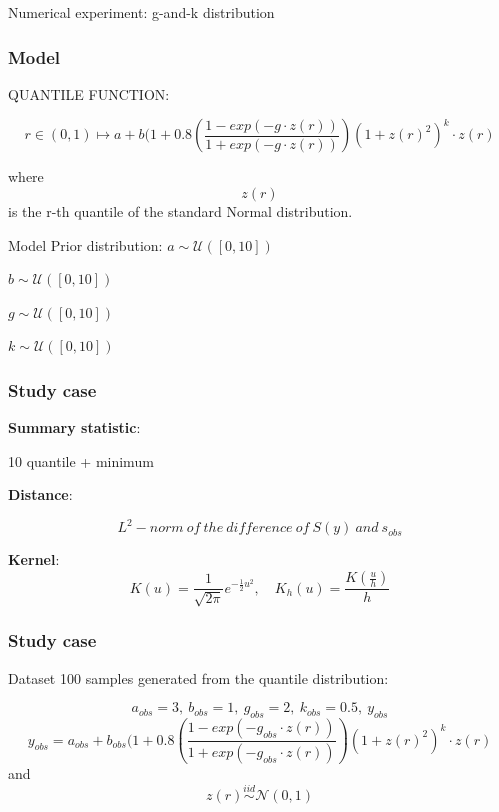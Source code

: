 \documentclass{beamer}
\begin{document}
\begin{section}{Numerical experiment: g-and-k distribution}
	\begin{frame}
		\frametitle{Model}
	\begin{block}{QUANTILE FUNCTION:}
		
		$$ r \in (0,1) \longmapsto   a + b (1+0.8\left(\frac{1-exp(-g \cdot z(r))}{1+exp(-g\cdot z(r))}\right)(1+ z(r)^{2})^k\cdot z(r)  $$
		\end{block}	
		where $$ z(r)$$ is the r-th quantile of the standard Normal distribution. 
	\begin{block}{Model}
		Prior distribution:
		$ a \sim \mathcal{U}([0,10])$
		
		$ b \sim \mathcal{U}([0,10])$
		
		$ g \sim \mathcal{U}([0,10])$
		
		$ k \sim \mathcal{U}([0,10])$
	\end{block}
	\end{frame}



\begin{frame}
	\frametitle{Study case}
	
	\textbf{Summary statistic}: \\
	\begin{center}
		10 quantile + minimum
	\end{center}
	
	\textbf{Distance}: 
	\begin{center}
		$$L^2-norm\ of\ the\ difference\ of\ S(y)\ and\ s_{obs}$$
	\end{center}   %
	
	\textbf{Kernel}: 
	$$
	K(u) = 
	\frac{1}{\sqrt{2\pi}} e^{-\frac{1}{2}u^2}, 
	\quad K_h(u) 
	= \frac{K(\frac u h)}{h}
	$$
	
\end{frame}


\begin{frame}
	\frametitle{Study case}
	\begin{block}{Dataset}
		100 samples generated from the quantile distribution:
		\begin{center}
			$$a_{obs}= 3, \ b_{obs}= 1, \ g_{obs}=2 , \ k_{obs}=0.5, \ y_{obs}$$
			$$	y_{obs} =a_{obs} + b_{obs} (1+0.8\left(\frac{1-exp(-g_{obs}\cdot z(r))}{1+exp(-g_{obs}\cdot z(r))}\right)(1+z(r)^{2})^k\cdot z(r)	$$
			and $$ z(r) \overset{iid}{\sim} \mathcal{N}(0,1) $$
		\end{center}
	\end{block}
	

\end{frame}
\end{section}
\end{document}
